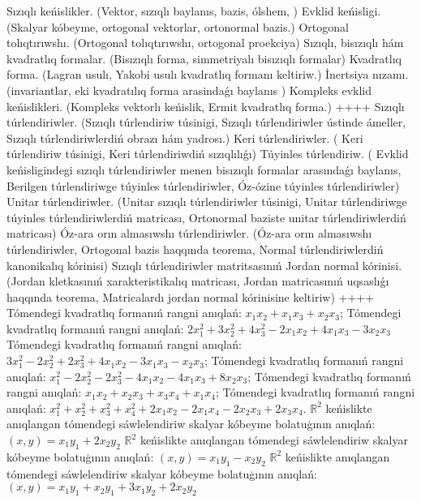 Sızıqlı keńislikler.   (Vektor,  sızıqlı baylanıs, bazis, ólshem, ) 
Evklid keńisligi. (Skalyar kóbeyme, ortogonal vektorlar, ortonormal bazis.)
Ortogonal  tolıqtırıwshı. (Ortogonal tolıqtırıwshı,  ortogonal proekciya)
Sızıqlı, bisızıqlı hám kvadratlıq formalar. (Bisızıqlı forma,  simmetriyalı bisızıqlı formalar) 
Kvadratlıq forma. (Lagran usulı, Yakobi usulı kvadratlıq formanı keltiriw.)
İnertsiya nızamı. (invariantlar,  eki kvadratılıq forma arasindaǵı baylanıs )
Kompleks evklid keńislikleri.  (Kompleks vektorlı keńislik, Ermit kvadratlıq forma.)
++++
Sızıqlı túrlendiriwler.  (Sızıqlı túrlendiriw túsinigi, Sızıqlı túrlendiriwler ústinde ámeller, Sızıqlı túrlendiriwlerdiń obrazı hám yadrosı.)
Keri túrlendiriwler. ( Keri túrlendiriw túsinigi,   Keri túrlendiriwdiń sızıqlılıǵı)
Túyinles túrlendiriw. ( Evklid keńisligindegi sızıqlı túrlendiriwler menen bisızıqlı formalar arasındaǵı baylanıs, Berilgen túrlendiriwge túyinles túrlendiriwler, Óz-ózine túyinles túrlendiriwler)
Unitar túrlendiriwler. (Unitar sızıqlı túrlendiriwler túsinigi,  Unitar túrlendiriwge túyinles túrlendiriwlerdiń matricası,   Ortonormal baziste unitar túrlendiriwlerdiń matricası)
Óz-ara orın almasıwshı túrlendiriwler. (Óz-ara orın almasıwshı túrlendiriwler,  Ortogonal bazis haqqında teorema,  Normal túrlendiriwlerdiń kanonikalıq kórinisi)
Sızıqlı túrlendiriwler matritsasınıń Jordan normal kórinisi. (Jordan kletkasınıń xarakteristikalıq matricası, Jordan matricasınıń uqsaslıǵı haqqında teorema,  Matricalardı jordan normal kórinisine keltiriw)
++++
Tómendegi kvadratlıq formanıń rangni anıqlań: \(x_{1}x_{2} + x_{1}x_{3} + x_{2}x_{3}\);
Tómendegi kvadratlıq formanıń rangni anıqlań: \(2x_{1}^{2} + 3x_{2}^{2} + 4x_{3}^{2} - 2x_{1}x_{2} + 4x_{1}x_{3} - 3x_{2}x_{3}\)
Tómendegi kvadratlıq formanıń rangni anıqlań: \(3x_{1}^{2} - 2x_{2}^{2} + 2x_{3}^{2} + 4x_{1}x_{2} - 3x_{1}x_{3} - x_{2}x_{3}\);
Tómendegi kvadratlıq formanıń rangni anıqlań: \(x_{1}^{2} - 2x_{2}^{2} - 2x_{3}^{2} - 4x_{1}x_{2} - 4x_{1}x_{3} + 8x_{2}x_{3}\);
Tómendegi kvadratlıq formanıń rangni anıqlań: \(x_{1}x_{2} + x_{2}x_{3} + x_{3}x_{4} + x_{1}x_{4}\);
Tómendegi kvadratlıq formanıń rangni anıqlań: \(x_{1}^{2} + x_{2}^{2} + x_{3}^{2} + x_{4}^{2} + 2x_{1}x_{2} - 2x_{1}x_{4} - 2x_{2}x_{3} + 2x_{3}x_{4}\).
\(\mathbb{R}^{2}\) keńislikte anıqlangan tómendegi sáwlelendiriw skalyar kóbeyme bolatuģının anıqlań: \((x,y) = x_{1}y_{1} + 2x_{2}y_{2}\)
\(\mathbb{R}^{2}\) keńislikte anıqlangan tómendegi sáwlelendiriw skalyar kóbeyme bolatuģının anıqlań: \((x,y) = x_{1}y_{1} - x_{2}y_{2}\)
\(\mathbb{R}^{2}\) keńislikte anıqlangan tómendegi sáwlelendiriw skalyar kóbeyme bolatuģının anıqlań: \((x,y) = x_{1}y_{1} + x_{2}y_{1} + 3x_{1}y_{2} + 2x_{2}y_{2}\)
